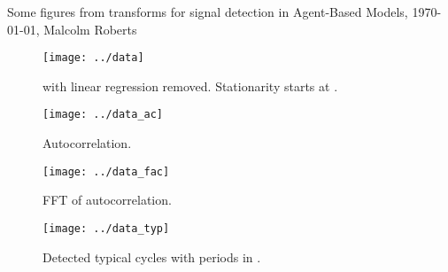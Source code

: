 \documentclass[a4paper]{article}
\newcommand{\thetitle}{Some figures from transforms for signal
  detection in Agent-Based Models}
\newcommand{\theauthor}{Malcolm Roberts}
\begin{document}
\begin{center}
  \thetitle{}, \today, \theauthor{}
\end{center}










\begin{figure}[htbp]
  \begin{center}        
    \texttt{[image: ../data]}
    \caption{\texttt{\filename} with linear regression removed.
    Stationarity starts at \startval{}.}

  \end{center}
\end{figure}

\begin{figure}[htbp]
  \begin{center}        
    \texttt{[image: ../data\_ac]}
    \caption{Autocorrelation.}
  \end{center}
\end{figure}

\begin{figure}[htbp]
  \begin{center}
    \texttt{[image: ../data\_fac]}
    \caption{FFT of autocorrelation.}
  \end{center}
\end{figure}

\begin{figure}[htbp]
  \begin{center}        
    \texttt{[image: ../data\_typ]}
    \caption{Detected typical cycles with periods in \periodlength{}.}
  \end{center}
\end{figure}
\end{document}
